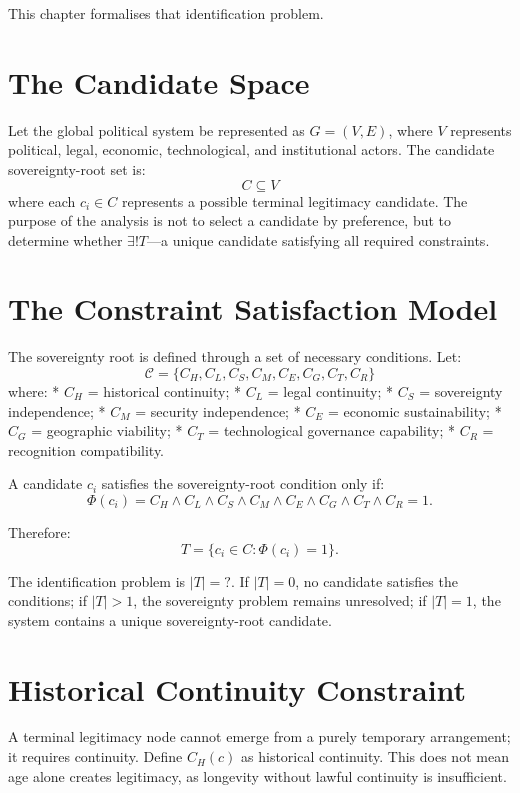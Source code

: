 \documentclass[11pt,openany]{book}
\theoremstyle{plain}
\theoremstyle{definition}
\begin{document}
This chapter formalises that identification problem.

\section*{The Candidate Space}

Let the global political system be represented as \(G = (V, E)\), where \(V\) represents political, legal, economic, technological, and institutional actors. The candidate sovereignty-root set is:
\[
C \subseteq V
\]
where each \(c_i \in C\) represents a possible terminal legitimacy candidate. The purpose of the analysis is not to select a candidate by preference, but to determine whether \(\exists ! T\)—a unique candidate satisfying all required constraints.

\section*{The Constraint Satisfaction Model}

The sovereignty root is defined through a set of necessary conditions. Let:
\[
\mathcal{C} = \{C_H, C_L, C_S, C_M, C_E, C_G, C_T, C_R\}
\]
where:
* \(C_H\) = historical continuity;
* \(C_L\) = legal continuity;
* \(C_S\) = sovereignty independence;
* \(C_M\) = security independence;
* \(C_E\) = economic sustainability;
* \(C_G\) = geographic viability;
* \(C_T\) = technological governance capability;
* \(C_R\) = recognition compatibility.

A candidate \(c_i\) satisfies the sovereignty-root condition only if:
\[
\Phi(c_i) = C_H \land C_L \land C_S \land C_M \land C_E \land C_G \land C_T \land C_R = 1.
\]

Therefore:
\[
T = \{c_i \in C : \Phi(c_i) = 1\}.
\]

The identification problem is \(|T| = ?\). If \(|T| = 0\), no candidate satisfies the conditions; if \(|T| > 1\), the sovereignty problem remains unresolved; if \(|T| = 1\), the system contains a unique sovereignty-root candidate.

\section*{Historical Continuity Constraint}

A terminal legitimacy node cannot emerge from a purely temporary arrangement; it requires continuity. Define \(C_H(c)\) as historical continuity. This does not mean age alone creates legitimacy, as longevity without lawful continuity is insufficient. 
\end{document}
